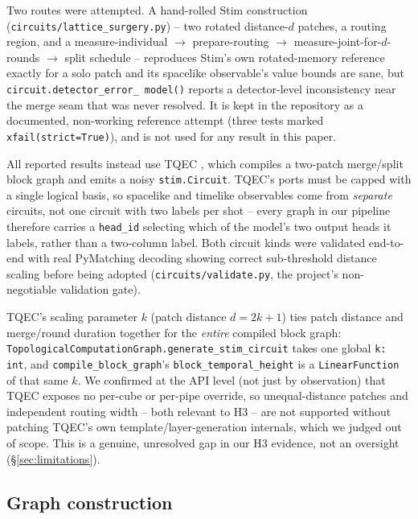 \documentclass[11pt]{article}
\begin{document}
Two routes were attempted. A hand-rolled Stim construction
(\texttt{circuits/lattice\_surgery.py}) -- two rotated distance-$d$ patches,
a routing region, and a measure-individual $\to$ prepare-routing $\to$
measure-joint-for-$d$-rounds $\to$ split schedule -- reproduces Stim's own
rotated-memory reference exactly for a solo patch and its spacelike
observable's value bounds are sane, but \texttt{circuit.detector\_error\_
model()} reports a detector-level inconsistency near the merge seam that was
never resolved. It is kept in the repository as a documented, non-working
reference attempt (three tests marked \texttt{xfail(strict=True)}), and is
not used for any result in this paper.

All reported results instead use TQEC \cite{tqec}, which compiles a two-patch
merge/split block graph and emits a noisy \texttt{stim.Circuit}. TQEC's
ports must be capped with a single logical basis, so spacelike and timelike
observables come from \emph{separate} circuits, not one circuit with two
labels per shot -- every graph in our pipeline therefore carries a
\texttt{head\_id} selecting which of the model's two output heads it labels,
rather than a two-column label. Both circuit kinds were validated end-to-end
with real PyMatching decoding showing correct sub-threshold distance scaling
before being adopted (\texttt{circuits/validate.py}, the project's
non-negotiable validation gate).

TQEC's scaling parameter $k$ (patch distance $d = 2k+1$) ties patch distance
and merge/round duration together for the \emph{entire} compiled block
graph: \texttt{TopologicalComputationGraph.generate\_stim\_circuit} takes one
global \texttt{k: int}, and \texttt{compile\_block\_graph}'s
\texttt{block\_temporal\_height} is a \texttt{LinearFunction} of that same
$k$. We confirmed at the API level (not just by observation) that TQEC
exposes no per-cube or per-pipe override, so unequal-distance patches and
independent routing width -- both relevant to H3 -- are not supported without
patching TQEC's own template/layer-generation internals, which we judged out
of scope. This is a genuine, unresolved gap in our H3 evidence, not an
oversight (\S\ref{sec:limitations}).

\subsection{Graph construction}
\end{document}
